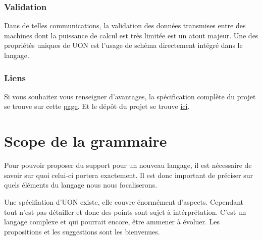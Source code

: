 \documentclass[
    iict, %
    il, %
]{heig-tb}
\begin{document}
\subsection{Validation}
Dans de telles communications, la validation des données transmises entre des machines dont la puissance de calcul est très limitée est un atout majeur.
Une des propriétés uniques de UON est l'usage de schéma directement intégré dans le langage.


\subsection{Liens}
Si vous souhaitez vous renseigner d'avantages, la spécification complète du projet se trouve sur cette \href{https://github.com/uon-language/specification/}{page}.
Et le dépôt du projet se trouve \href{https://github.com/uon-language/specification}{ici}.







\chapter{Scope de la grammaire}\label{grammar scope}
Pour pouvoir proposer du support pour un nouveau langage, il est nécessaire de savoir sur quoi celui-ci portera exactement.
Il est donc important de préciser sur quels éléments du langage nous nous focaliserons.

Une spécifiation d'UON existe, elle couvre énormément d'aspects. Cependant tout n'est pas détailler et donc des points sont sujet à intérprétation.
C'est un langage complexe et qui pourrait encore, être ammener à évoluer. Les propositions et les suggestions sont les bienvenues.
\end{document}
